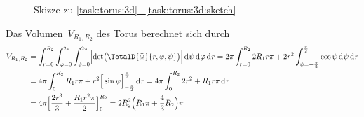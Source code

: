 \documentclass[../full]{subfiles}
\begin{document}
    \begin{figure}
        \centering

        \caption*{%
            Skizze zu
            \hyperref[task:torus:3d:sketch]{%
                \ref*{task:torus:3d}%
                ~\ref*{task:torus:3d:sketch}%
            }%
        }
        \label{task:torus:3d:sketch:visual}
    \end{figure}



    Das Volumen~\( V_{R_1, R_2} \) des Torus berechnet sich durch
    \begin{align*}
        V_{R_1, R_2} &
        = \int_{r = 0}^{R_2}
            \int_{\varphi = 0}^{2 \pi}
                \int_{\psi = 0}^{2 \pi} \abs[\Big]{
                    \det \paren[\big]{\TotalD{\Phi}{r, \varphi, \psi}}
                } \dx[\psi]
            \dx[\varphi]
        \dx[r]
        = 2 \pi \int_{r = 0}^{R_2}
            2 R_1 r \pi
            + 2 r^2 \int_{\psi = -\frac{\pi}{2}}^{\frac{\pi}{2}}
                \cos \psi
            \dx[\psi]
        \dx[r]
        \\ &
        = 4 \pi \int_0^{R_2}
            R_1 r \pi
            + r^2 \FunctionBounds{\sin \psi}{-\frac{\pi}{2}}{\frac{\pi}{2}}
        \dx[r]
        = 4 \pi \int_0^{R_2} 2 r^2 + R_1 r \pi \dx[r]
        \\ &
        = 4 \pi \FunctionBounds{\frac{2 r^3}{3} + \frac{R_1 r^2 \pi}{2}}{0}{R_2}
        = 2 R_2^2 \paren[\Big]{R_1 \pi + \frac{4}{3} R_2} \pi
    \end{align*}
\end{document}
